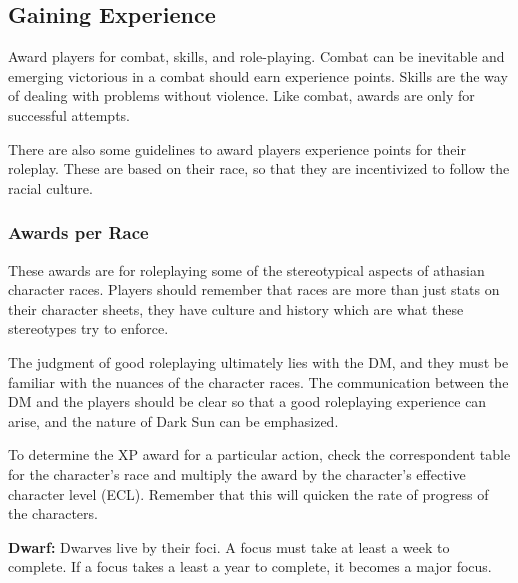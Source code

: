 \subsection{Gaining Experience}
Award players for combat, skills, and role-playing. Combat can be inevitable and emerging victorious in a combat should earn experience points. Skills are the way of dealing with problems without violence. Like combat, awards are only for successful attempts.

There are also some guidelines to award players experience points for their roleplay. These are based on their race, so that they are incentivized to follow the racial culture.

\subsubsection{Awards per Race}
These awards are for roleplaying some of the stereotypical aspects of athasian character races. Players should remember that races are more than just stats on their character sheets, they have culture and history which are what these stereotypes try to enforce.

The judgment of good roleplaying ultimately lies with the DM, and they must be familiar with the nuances of the character races. The communication between the DM and the players should be clear so that a good roleplaying experience can arise, and the nature of {\tableheader Dark Sun} can be emphasized.

To determine the XP award for a particular action, check the correspondent table for the character's race and multiply the award by the character's effective character level (ECL). Remember that this will quicken the rate of progress of the characters.




\textbf{Dwarf:} Dwarves live by their foci. A focus must take at least a week to complete. If a focus takes a least a year to complete, it becomes a major focus.

